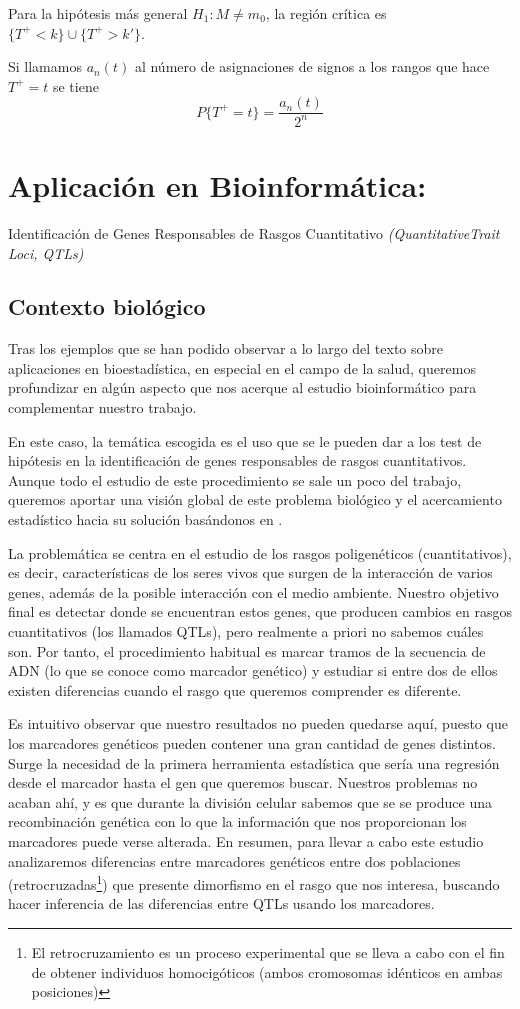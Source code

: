 \documentclass[a4paper,12pt]{article}
\begin{document}
Para la hipótesis más general $H_1: M \neq m_0$, la región crítica es $\{ T^+<k\}\cup\{T^+ >k'\}.$

Si llamamos $a_n(t)$ al número de asignaciones de signos a los rangos que hace $T^+=t$ se tiene $$P\{T^+ = t\}=\frac{a_n(t)}{2^n}$$ 





\section{Aplicación en Bioinformática:}
\large{Identificación de Genes Responsables de Rasgos Cuantitativo \textit{(QuantitativeTrait Loci, QTLs)}}
\normalsize{}
\subsection{Contexto biológico}
Tras los ejemplos que se han podido observar a lo largo del texto sobre aplicaciones en bioestadística, en especial en el campo de la salud, queremos profundizar en algún aspecto que nos acerque al estudio bioinformático para complementar nuestro trabajo.

En este caso, la temática escogida es el uso que se le pueden dar a los test de hipótesis en la identificación de genes responsables de rasgos cuantitativos. Aunque todo el estudio de este procedimiento se sale un poco del trabajo, queremos aportar una visión global de este problema biológico y el acercamiento estadístico hacia su solución basándonos en \cite{uned2}.

La problemática se centra en el estudio de los rasgos poligenéticos (cuantitativos), es decir, características de los seres vivos que surgen de la interacción de varios genes, además de la posible interacción con el medio ambiente. 
Nuestro objetivo final es detectar donde se encuentran estos genes, que producen cambios en rasgos cuantitativos (los llamados QTLs), pero realmente a priori no sabemos cuáles son. Por tanto, el procedimiento habitual es marcar tramos de la secuencia de ADN (lo que se conoce como marcador genético) y estudiar si entre dos de ellos existen diferencias cuando el rasgo que queremos comprender es diferente. 

Es intuitivo observar que nuestro resultados no pueden quedarse aquí, puesto que los marcadores genéticos pueden contener una gran cantidad de genes distintos. Surge la necesidad de la primera herramienta estadística que sería una regresión desde el marcador hasta el gen que queremos buscar. Nuestros problemas no acaban ahí, y es que durante la división celular sabemos que se se produce una recombinación genética con lo que la información que nos proporcionan los marcadores puede verse alterada. 
En resumen, para llevar a cabo este estudio analizaremos diferencias entre marcadores genéticos entre dos poblaciones (retrocruzadas\footnote{El retrocruzamiento es un proceso experimental que se lleva a cabo con el fin de obtener individuos homocigóticos (ambos cromosomas idénticos en ambas posiciones)}) que presente dimorfismo en el rasgo que nos interesa, buscando hacer inferencia de las diferencias entre QTLs usando los marcadores.
\end{document}

